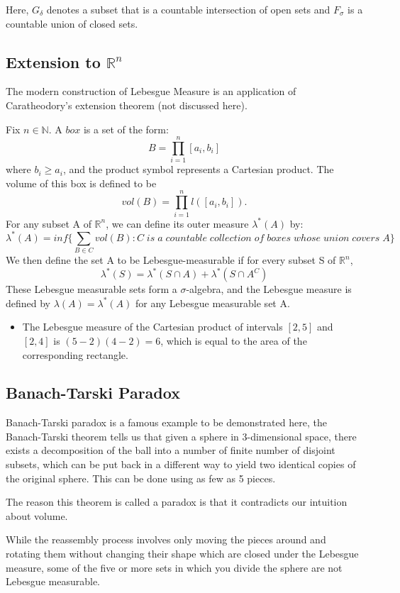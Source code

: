 \documentclass{article}
\begin{document}
Here, $G_{\delta}$ denotes a subset that is a countable intersection of open sets and $F_{\sigma}$ is a countable union of closed sets.

\subsection{Extension to $\mathbb{R}^n$}

The modern construction of Lebesgue Measure is an application of 
Caratheodory's extension theorem (not discussed here).

Fix $n \in \mathbb{N}$. A $box$ is a set of the form:
$$ B= \prod_{i=1}^{n}[a_i,b_i]$$
where $b_i \geq a_i$, and the product symbol represents a Cartesian product. The volume of this box is defined to be
$$ vol(B)=\prod_{i=1}^{n}l([a_i,b_i]).$$
For any subset A of $\mathbb{R}^n$, we can define its outer measure $\lambda^{*}(A)$ by:
$$\lambda^{*}(A)=inf\Big\{ \sum_{B \in C}vol(B): C\; is\; a\; countable \;collection\; of \;boxes\; whose\; union\; covers \; A\Big\}$$
We then define the set A to be Lebesgue-measurable if for every subset S of $\mathbb{R}^n$, 
$$\lambda^{*}(S)= \lambda^{*}(S \cap A) + \lambda^{*}(S \cap A^C)$$
These Lebesgue measurable sets form a $\sigma$-algebra, and the Lebesgue measure is defined by $\lambda(A)=\lambda^{*}(A)$ for any Lebesgue measurable set A.
\begin{itemize}
    \item The Lebesgue measure of the Cartesian product of intervals $[2, 5]$ and $[2, 4]$ is $(5-2)(4-2) = 6$, which is equal to the area of the corresponding rectangle.
\end{itemize}

\subsection{Banach-Tarski Paradox}
Banach-Tarski paradox is a famous example to be demonstrated here, the Banach-Tarski theorem tells us that given a sphere in 3-dimensional space, there exists a decomposition of the ball into a number of finite number of disjoint subsets, which can be put back in a different way to yield two identical copies of the original sphere. This can be done using as few as 5 pieces.\medskip

The reason this theorem is called a paradox is that it contradicts our intuition about volume.

While the reassembly process involves only moving the pieces around and rotating them without changing their shape which are closed under the Lebesgue measure, some of the five or more sets in which you divide the sphere are not Lebesgue measurable.
\end{document}
